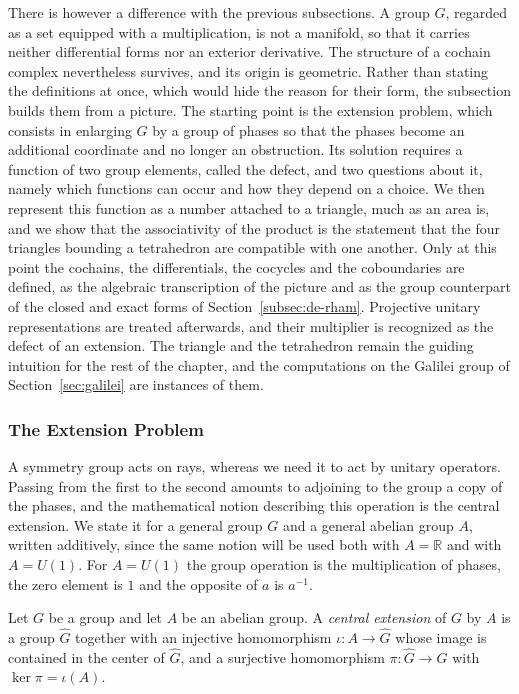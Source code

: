 There is however a difference with the previous subsections. A group $G$, regarded as a set equipped with a multiplication, is not a manifold, so that it carries neither differential forms nor an exterior derivative. The structure of a cochain complex nevertheless survives, and its origin is geometric. Rather than stating the definitions at once, which would hide the reason for their form, the subsection builds them from a picture. The starting point is the extension problem, which consists in enlarging $G$ by a group of phases so that the phases become an additional coordinate and no longer an obstruction. Its solution requires a function of two group elements, called the defect, and two questions about it, namely which functions can occur and how they depend on a choice. We then represent this function as a number attached to a triangle, much as an area is, and we show that the associativity of the product is the statement that the four triangles bounding a tetrahedron are compatible with one another. Only at this point the cochains, the differentials, the cocycles and the coboundaries are defined, as the algebraic transcription of the picture and as the group counterpart of the closed and exact forms of Section~\ref{subsec:de-rham}. Projective unitary representations are treated afterwards, and their multiplier is recognized as the defect of an extension. The triangle and the tetrahedron remain the guiding intuition for the rest of the chapter, and the computations on the Galilei group of Section~\ref{sec:galilei} are instances of them.

\subsubsection*{The Extension Problem}

A symmetry group acts on rays, whereas we need it to act by unitary operators. Passing from the first to the second amounts to adjoining to the group a copy of the phases, and the mathematical notion describing this operation is the central extension. We state it for a general group $G$ and a general abelian group $A$, written additively, since the same notion will be used both with $A=\mathbb{R}$ and with $A=U(1)$. For $A=U(1)$ the group operation is the multiplication of phases, the zero element is $1$ and the opposite of $a$ is $a^{-1}$.

\begin{definition}\label{def:central-extension}
	Let $G$ be a group and let $A$ be an abelian group. A \emph{central extension} of $G$ by $A$ is a group $\widehat{G}$ together with an injective homomorphism $\iota:A\to\widehat{G}$ whose image is contained in the center of $\widehat{G}$, and a surjective homomorphism $\pi:\widehat{G}\to G$ with $\ker\pi=\iota(A)$.
\end{definition}

